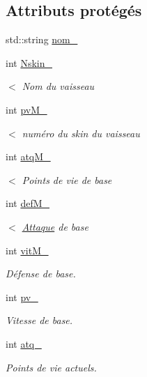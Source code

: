 \subsection*{Attributs protégés}
\begin{DoxyCompactItemize}
\item 
std\+::string \hyperlink{class_vaisseau_a2abb8ab70479bc486d19b563dddbe825}{nom\+\_\+}
\item 
int \hyperlink{class_vaisseau_af6b149a2f49de284503d5e3f80e2735a}{Nskin\+\_\+}
\begin{DoxyCompactList}\small\item\em $<$ Nom du vaisseau \end{DoxyCompactList}\item 
int \hyperlink{class_vaisseau_ac8b21f62b8c41f90864b1bca81d685de}{pv\+M\+\_\+}
\begin{DoxyCompactList}\small\item\em $<$ numéro du skin du vaisseau \end{DoxyCompactList}\item 
int \hyperlink{class_vaisseau_a24d3d623d4f470aa1a11222c3872b2ec}{atq\+M\+\_\+}
\begin{DoxyCompactList}\small\item\em $<$ Points de vie de base \end{DoxyCompactList}\item 
int \hyperlink{class_vaisseau_ad62e88bb7527f72a6a446d9bbb219744}{def\+M\+\_\+}
\begin{DoxyCompactList}\small\item\em $<$ \hyperlink{class_attaque}{Attaque} de base \end{DoxyCompactList}\item 
int \hyperlink{class_vaisseau_a7cf3915f4d4044ee28fd5e5633fce11c}{vit\+M\+\_\+}
\begin{DoxyCompactList}\small\item\em Défense de base. \end{DoxyCompactList}\item 
int \hyperlink{class_vaisseau_ac57363910a13299dd8b10534683c0ad8}{pv\+\_\+}
\begin{DoxyCompactList}\small\item\em Vitesse de base. \end{DoxyCompactList}\item 
int \hyperlink{class_vaisseau_a2b2a2de0e527ed46550922427e067c95}{atq\+\_\+}
\begin{DoxyCompactList}\small\item\em Points de vie actuels. \end{DoxyCompactList}\item 

\end{DoxyCompactItemize}
